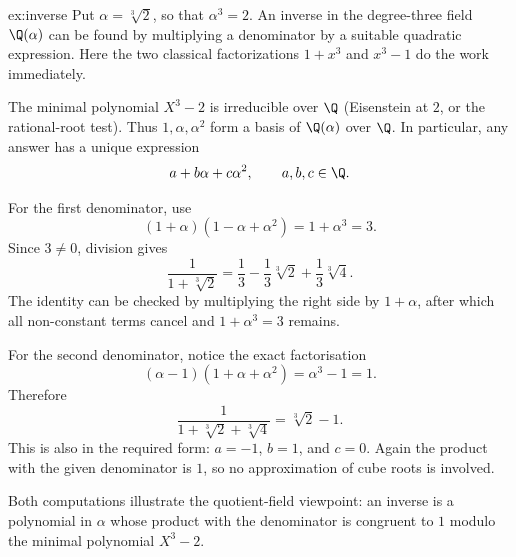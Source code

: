 \begin{solution}{ex:inverse}
\idea Put $\alpha=\sqrt[3]{2}$, so that $\alpha^3=2$. An inverse in the degree-three field $\Q(\alpha)$ can be found by multiplying a denominator by a suitable quadratic expression. Here the two classical factorizations $1+x^3$ and $x^3-1$ do the work immediately.

\writeup The minimal polynomial $X^3-2$ is irreducible over $\Q$ (Eisenstein at $2$, or the rational-root test). Thus $1,\alpha,\alpha^2$ form a basis of $\Q(\alpha)$ over $\Q$. In particular, any answer has a unique expression
\[
a+b\alpha+c\alpha^2,\qquad a,b,c\in\Q.
\]

For the first denominator, use
\[
(1+\alpha)(1-\alpha+\alpha^2)=1+\alpha^3=3.
\]
Since $3\ne0$, division gives
\[
\boxed{\frac1{1+\sqrt[3]{2}}
=\frac13-\frac13\sqrt[3]{2}+\frac13\sqrt[3]{4}}.
\]
The identity can be checked by multiplying the right side by $1+\alpha$, after which all non-constant terms cancel and $1+\alpha^3=3$ remains.

For the second denominator, notice the exact factorisation
\[
(\alpha-1)(1+\alpha+\alpha^2)=\alpha^3-1=1.
\]
Therefore
\[
\boxed{\frac1{1+\sqrt[3]{2}+\sqrt[3]{4}}
=\sqrt[3]{2}-1}.
\]
This is also in the required form: $a=-1$, $b=1$, and $c=0$. Again the product with the given denominator is $1$, so no approximation of cube roots is involved.

Both computations illustrate the quotient-field viewpoint: an inverse is a polynomial in $\alpha$ whose product with the denominator is congruent to $1$ modulo the minimal polynomial $X^3-2$.
\end{solution}


